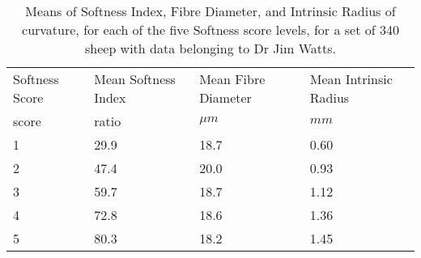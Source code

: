 %

\begin{table}[htp]
\centering
\caption{Means of Softness Index, Fibre Diameter, and Intrinsic Radius of curvature, for each of the five Softness score levels, for a set of 340 sheep with data belonging to Dr Jim Watts.}
\label{tab:soft}
\vspace{0.1in}
\begin{tabular}{|p{1.0in}|p{1.0in}|p{1.0in}|p{1.0in}|}  \hline
    Softness Score & Mean Softness Index  & Mean Fibre Diameter  & Mean Intrinsic Radius  \\ 
  score & ratio & $\mu m$ & $mm$ \\ \hline
  1 & 29.9 & 18.7 & 0.60 \\
  2 & 47.4 & 20.0 & 0.93 \\
  3 & 59.7 & 18.7 & 1.12 \\
  4 & 72.8 & 18.6 & 1.36 \\
  5 & 80.3 & 18.2 & 1.45  \\ \hline
\end{tabular}
\end{table}

%

